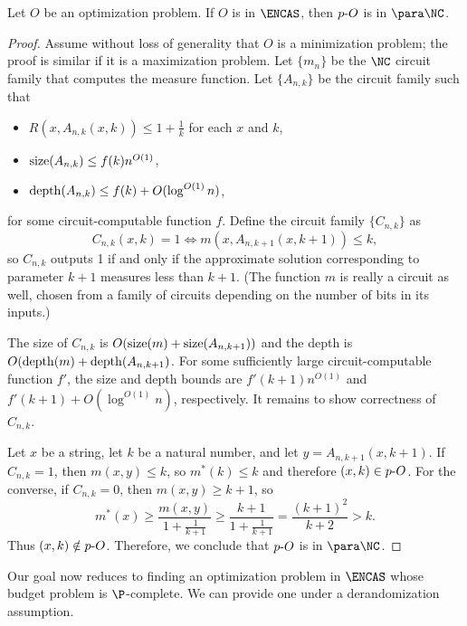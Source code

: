 \begin{theorem}\label{thm:encasfpp}
  Let $O$ be an optimization problem.
  If $O$ is in $\ENCAS$, then $p\textnormal{-}{O}$ is in $\para \NC$.
\end{theorem}
\begin{proof}
  Assume without loss of generality that $O$ is a minimization problem; the proof is similar if it is a maximization problem.
  Let $\{m_n\}$ be the $\NC$ circuit family that computes the measure function.
  Let $\{A_{n, k}\}$ be the circuit family such that
  \begin{itemize}
  \item $R(x, A_{n, k}(x, k)) \leq 1 + \frac{1}{k}$ for each $x$ and $k$,
  \item $\operatorname{size}(A_{n, k}) \leq f(k) n^{O(1)}$,
  \item $\operatorname{depth}(A_{n, k}) \leq f(k) + O(\log^{O(1)} n)$,
  \end{itemize}
  for some circuit-computable function $f$.
  Define the circuit family $\{C_{n, k}\}$ as
  \[
  C_{n, k}(x, k) = 1 \iff m(x, A_{n, k + 1}(x, k + 1)) \leq k,
  \]
  so $C_{n, k}$ outputs 1 if and only if the approximate solution corresponding to parameter $k + 1$ measures less than $k + 1$.
  (The function $m$ is really a circuit as well, chosen from a family of circuits depending on the number of bits in its inputs.)

  The size of $C_{n, k}$ is $O(\operatorname{size}(m) + \operatorname{size}(A_{n, k + 1}))$ and the depth is $O(\operatorname{depth}(m) + \operatorname{depth}(A_{n, k + 1})$.
  For some sufficiently large circuit-computable function $f'$, the size and depth bounds are $f'(k + 1) n^{O(1)}$ and $f'(k + 1) + O(\log^{O(1)} n)$, respectively.
  It remains to show correctness of $C_{n, k}$.

  Let $x$ be a string, let $k$ be a natural number, and let $y = A_{n, k + 1}(x, k + 1)$.
  If $C_{n, k} = 1$, then $m(x, y) \leq k$, so $m^*(k) \leq k$ and therefore $(x, k) \in p \textnormal{-} O$.
  For the converse, if $C_{n, k} = 0$, then $m(x, y) \geq k + 1$, so
  \[
  m^*(x) \geq \frac{m(x, y)}{1 + \frac{1}{k + 1}} \geq \frac{k + 1}{1 + \frac{1}{k + 1}} = \frac{(k + 1)^2}{k + 2} > k.
  \]
  Thus $(x, k) \notin p \textnormal{-} O$.
  Therefore, we conclude that $p \textnormal{-} O$ is in $\para \NC$.
\end{proof}


Our goal now reduces to finding an optimization problem in $\ENCAS$ whose budget problem is $\P$-complete.
We can provide one under a derandomization assumption.

